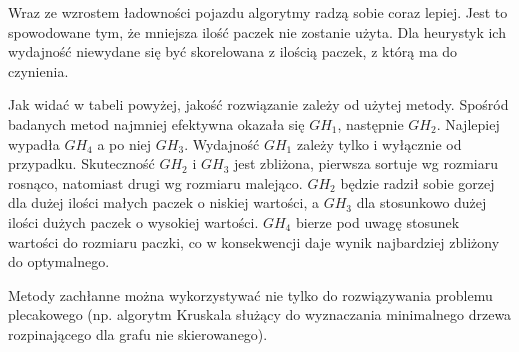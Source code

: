 \documentclass[polish,polish,a4paper]{article}
\begin{document}
\begin{spacing}{1.35}
Wraz ze wzrostem ładowności pojazdu algorytmy radzą sobie coraz lepiej. Jest to spowodowane tym, że mniejsza ilość paczek nie zostanie użyta. Dla heurystyk ich wydajność niewydane się być skorelowana z ilością paczek, z którą ma do czynienia.

Jak widać w tabeli powyżej, jakość rozwiązanie zależy od użytej metody. Spośród badanych metod najmniej efektywna okazała się $GH_{1}$, następnie $GH_{2}$. Najlepiej wypadła $GH_{4}$ a po niej $GH_{3}$. Wydajność $GH_{1}$ zależy tylko i wyłącznie od przypadku. Skuteczność $GH_{2}$ i $GH_{3}$ jest zbliżona, pierwsza sortuje wg rozmiaru rosnąco, natomiast drugi wg rozmiaru malejąco. $GH_{2}$ będzie radził sobie gorzej dla dużej ilości małych paczek o niskiej wartości, a $GH_{3}$ dla stosunkowo dużej ilości dużych paczek o wysokiej wartości. $GH_{4}$ bierze pod uwagę stosunek wartości do rozmiaru paczki, co w konsekwencji daje  wynik najbardziej zbliżony do optymalnego. 

Metody zachłanne można wykorzystywać nie tylko do rozwiązywania problemu plecakowego (np. algorytm Kruskala służący do wyznaczania minimalnego drzewa rozpinającego dla grafu nie skierowanego). 



\end{spacing}
	\newpage
	\tableofcontents
\end{document}
